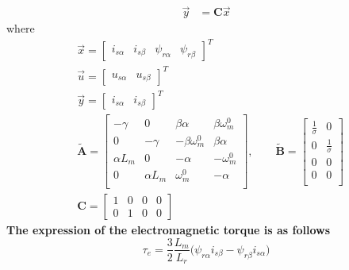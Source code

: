 \documentclass[12pt,a4paper,oneside]{book}
\begin{document}
\begin{onehalfspace}
\begin{mybox}
\begin{equation}
\begin{aligned}
			\\[6pt]
			{\vec{y}} &={\mathbf{C}}\vec{x}
		\end{aligned}
	\end{equation}
	where
	\begin{equation}\label{im_control_problem_eq_5}
		\begin{aligned}
			&\vec{x} = \begin{bmatrix} 
				i_{s\alpha}&i_{s\beta}&\psi_{r\alpha}&\psi_{r\beta} 
			\end{bmatrix}^T\\[6pt]
			&\vec{u} = \begin{bmatrix} u_{s\alpha}&u_{s\beta} 
			\end{bmatrix}^T\\[6pt]
			&\vec{y} = \begin{bmatrix} i_{s\alpha}&i_{s\beta} 
			\end{bmatrix}^T\\[6pt]
			&\tilde{\mathbf{A}} = \begin{bmatrix}
				-\gamma&0&\beta\alpha&\beta\omega_m^0 \\[6pt]			
				0&-\gamma&-\beta\omega_m^0&\beta\alpha \\[6pt]
				\alpha L_m&0&-\alpha&-\omega_m^0 \\[6pt]
				0&\alpha L_m&\omega_m^0&-\alpha \\[6pt]
			\end{bmatrix},\qquad
			\tilde{\mathbf{B}} = \begin{bmatrix}
				\frac{1}{\sigma}&0 \\[6pt]			
				0&\frac{1}{\sigma} \\[6pt]
				0&0 \\[6pt]
				0&0 \\[6pt]
			\end{bmatrix} \\[6pt]
			&\mathbf{C} = \begin{bmatrix}
				1&0&0&0 \\[6pt]			
				0&1&0&0	
			\end{bmatrix}
		\end{aligned}
	\end{equation}
	\textbf{The expression of the electromagnetic torque is as follows}
	\begin{equation}\label{im_control_problem_eq_6}
		\tau_e = \frac{3}{2}\frac{L_m}{L_r}\Big(\psi_{r\alpha}i_{s\beta} - 
		\psi_{r\beta}i_{s\alpha}\Big)
	\end{equation}
\end{mybox}


\end{onehalfspace}
\end{document}
